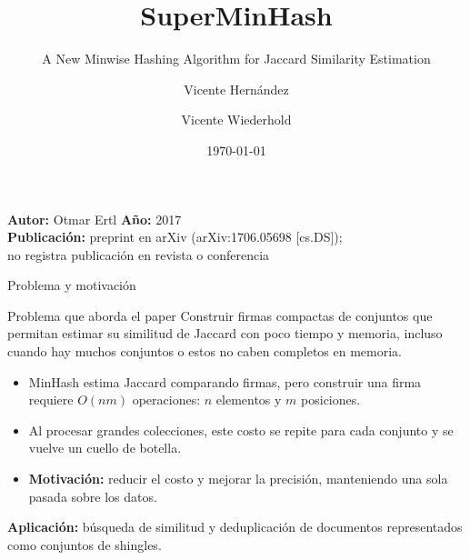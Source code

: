 \documentclass[aspectratio=169,11pt]{beamer}
\title[SuperMinHash]{SuperMinHash}
\subtitle{A New Minwise Hashing Algorithm for Jaccard Similarity Estimation}
\author[V.~Hern\'andez \and V.~Wiederhold]{Vicente Hern\'andez \and Vicente Wiederhold}
\institute{An\'alisis de Grandes Vol\'umenes de Datos}
\date{\today}
\begin{document}
\begin{frame}
  \titlepage
  \vspace{0.4em}
  \centering
  {\footnotesize
    \textbf{Autor:} Otmar Ertl \textperiodcentered{} \textbf{Año:} 2017\\
    \textbf{Publicación:} preprint en arXiv (arXiv:1706.05698 [cs.DS]);\\
    no registra publicación en revista o conferencia}
\end{frame}

\begin{frame}{Problema y motivación}
  \begin{block}{Problema que aborda el paper}
    Construir firmas compactas de conjuntos que permitan estimar su similitud
    de Jaccard con poco tiempo y memoria, incluso cuando hay muchos conjuntos
    o estos no caben completos en memoria.
  \end{block}
  \begin{itemize}
    \item MinHash estima Jaccard comparando firmas, pero construir una firma
          requiere $O(nm)$ operaciones: $n$ elementos y $m$ posiciones.
    \item Al procesar grandes colecciones, este costo se repite para cada
          conjunto y se vuelve un cuello de botella.
    \item \textbf{Motivación:} reducir el costo y mejorar la precisión,
          manteniendo una sola pasada sobre los datos.
  \end{itemize}
  \vfill
  \centering
  \textbf{Aplicación:} búsqueda de similitud y deduplicación de documentos
  representados como conjuntos de shingles.
\end{frame}
\end{document}
